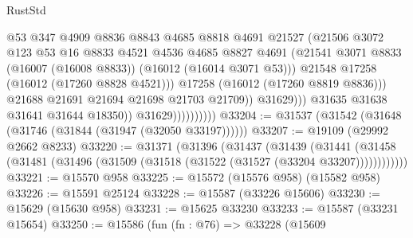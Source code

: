 \begin{lexlean}{RustStd}
\begin{coremodule}
                                        @53
                                        @347
                                        @4909
                                        @8836
                                        @8843
                                        @4685
                                        @8818
                                        @4691
                                        @21527
                                        (@21506
                                          @3072
                                          @123
                                          @53
                                          @16
                                          @8833
                                          @4521
                                          @4536
                                          @4685
                                          @8827
                                          @4691
                                          (@21541
                                            @3071
                                            @8833
                                            (@16007 (@16008 @8833))
                                            (@16012 (@16014 @3071 @53)))
                                          @21548
                                          @17258
                                          (@16012 (@17260 @8828 @4521)))
                                        @17258
                                        (@16012 (@17260 @8819 @8836)))
                                      @21688
                                      @21691
                                      @21694
                                      @21698
                                      @21703
                                      @21709))
                                  @31629)))
                            @31635
                            @31638
                            @31641
                            @31644
                            @18350))
                        @31629))))))))))
@33204 := @31537 (@31542 (@31648 (@31746 (@31844 (@31947 (@32050 @33197))))))
@33207 := @19109 (@29992 @2662 @8233)
@33220 := @31371
    (@31396
      (@31437
        (@31439
          (@31441 (@31458 (@31481 (@31496 (@31509 (@31518 (@31522 (@31527 (@33204 @33207))))))))))))
@33221 := @15570 @958
@33225 := @15572 (@15576 @958) (@15582 @958)
@33226 := @15591 @25124
@33228 := @15587 (@33226 @15606)
@33230 := @15629 (@15630 @958)
@33231 := @15625 @33230
@33233 := @15587 (@33231 @15654)
@33250 := @15586
    (fun (fn : @76) =>
    @33228
      (@15609

\end{coremodule}
\end{lexlean}
